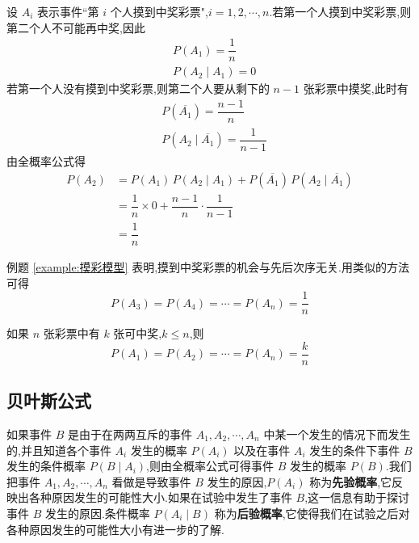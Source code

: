 \begin{solution}
    设 $A_i$ 表示事件``第 $i$ 个人摸到中奖彩票",$i=1,2,\cdots,n$.若第一个人摸到中奖彩票,则第二个人不可能再中奖,因此
    $$
    \begin{aligned}
        & P(A_1) = \dfrac{1}{n} \\
        & P(A_2 \mid A_1) = 0
    \end{aligned}
    $$
    若第一个人没有摸到中奖彩票,则第二个人要从剩下的 $n-1$ 张彩票中摸奖,此时有
    $$
    \begin{aligned}
        & P(\overline{A_1}) = \dfrac{n-1}{n} \\
        & P(A_2 \mid \overline{A_1}) = \dfrac{1}{n-1}
    \end{aligned}
    $$
    由全概率公式得
    $$
    \begin{aligned}
        P(A_2) &= P(A_1) \, P(A_2 \mid A_1) + P(\overline{A_1}) \, P(A_2 \mid \overline{A_1}) \\
        &= \dfrac{1}{n} \times 0 + \dfrac{n-1}{n} \cdot \dfrac{1}{n-1} \\
        &= \dfrac{1}{n}
    \end{aligned}
    $$
\end{solution}

\begin{note}
    \indent 例题 \ref{example:摸彩模型} 表明,摸到中奖彩票的机会与先后次序无关.用类似的方法可得
    $$
    P(A_3) = P(A_4) = \cdots = P(A_n) = \dfrac{1}{n}
    $$
    
    如果 $n$ 张彩票中有 $k$ 张可中奖,$k \leqslant n$,则
    $$
    P(A_1) = P(A_2) = \cdots = P(A_n) = \dfrac{k}{n}
    $$
\end{note}

\subsection{贝叶斯公式}

如果事件 $B$ 是由于在两两互斥的事件 $A_1,A_2,\cdots,A_n$ 中某一个发生的情况下而发生的,并且知道各个事件 $A_i$ 发生的概率 $P(A_i)$ 以及在事件 $A_i$ 发生的条件下事件 $B$ 发生的条件概率 $P(B \mid A_i)$,则由全概率公式可得事件 $B$ 发生的概率 $P(B)$.我们把事件 $A_1,A_2,\cdots,A_n$ 看做是导致事件 $B$ 发生的原因,$P(A_i)$ 称为\textbf{先验概率},它反映出各种原因发生的可能性大小.如果在试验中发生了事件 $B$,这一信息有助于探讨事件 $B$ 发生的原因.条件概率 $P(A_i \mid B)$ 称为\textbf{后验概率},它使得我们在试验之后对各种原因发生的可能性大小有进一步的了解.

